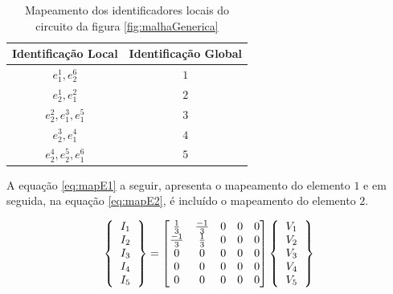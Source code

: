 \documentclass[
    12pt,               %
    openright,          %
    oneside,
    a4paper,            %
    english,            %
    french,             %
    spanish,            %
    brazil              %
    ]{abntex2}
\begin{document}
\begin{table} 
    \centering
    \begin{tabular}{|c|c|}  
        \hline
        \textbf{Identificação Local} 
        & \textbf{Identificação Global} \\  
        \hline
        $e_1^1, e_2^6$ 
        & $1$ \\
        \hline
        $e_2^1, e_1^2$
        & $2$  \\
        \hline
        $e_2^2, e_1^3, e_1^5$
        & $3$ \\
        \hline
        $e_2^3, e_1^4$
        & $4$  \\
		\hline
        $e_2^4, e_2^5, e_1^6$
        & $5$  \\        
        \hline
    \end{tabular}
    \caption{Mapeamento dos identificadores locais do circuito da figura \ref{fig:malhaGenerica}}
    \label{tab:mapLG}
\end{table}

A equação \ref{eq:mapE1} a seguir, apresenta o mapeamento do elemento $1$ e em seguida, na equação \ref{eq:mapE2}, é incluído o mapeamento do elemento $2$.  

  \begin{equation}
     \label{eq:mapE1}
	\left \{
     \begin{tabular}{c}
         $I_1$ \\
         $I_2$ \\
         $I_3$ \\
         $I_4$ \\
         $I_5$          
     \end{tabular}       
     \right \}
     =
	  \begin{bmatrix}
	         \frac{1}{3} & \frac{-1}{3}  & 0 & 0 & 0 \\
	         \frac{-1}{3} & \frac{1}{3}  & 0 & 0 & 0 \\
	         0 & 0 & 0 & 0 & 0 \\
	         0 & 0 & 0 & 0 & 0 \\
	         0 & 0 & 0 & 0 & 0 \\
	     \end{bmatrix} 
	\left \{
     \begin{tabular}{c}
         $V_1$ \\
         $V_2$ \\
         $V_3$ \\
         $V_4$ \\
         $V_5$          
     \end{tabular}       
     \right \}	                     
  \end{equation}
\end{document}
